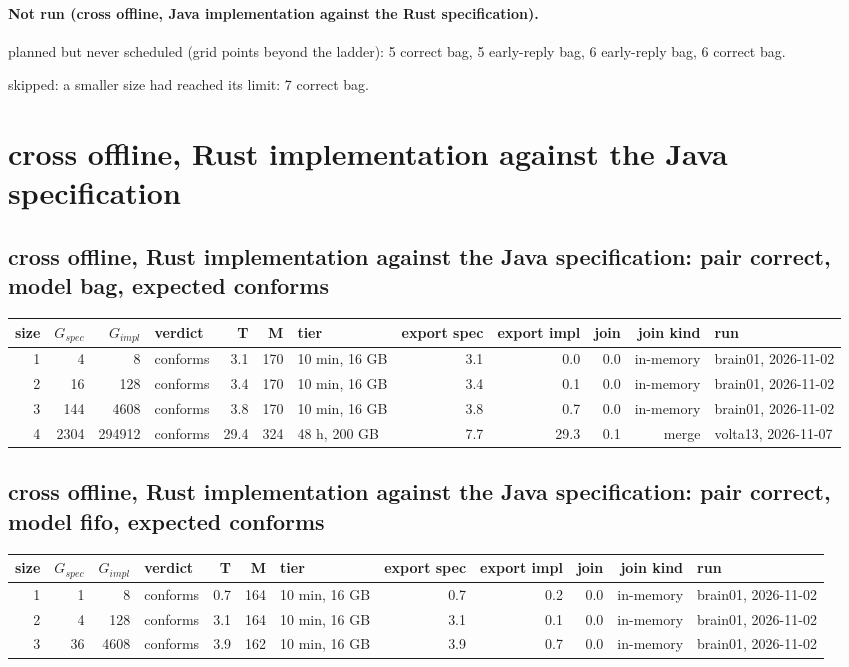 \documentclass[10pt]{article}
\begin{document}
\paragraph{Not run (cross offline, Java implementation against the Rust specification).}
planned but never scheduled (grid points beyond the ladder): 5 correct bag, 5 early-reply bag, 6 early-reply bag, 6 correct bag.\par
skipped: a smaller size had reached its limit: 7 correct bag.\par
\section*{cross offline, Rust implementation against the Java specification}
\subsection*{cross offline, Rust implementation against the Java specification: pair \textsf{correct}, model bag, expected conforms}
\begin{longtable}{@{}rrrlrrlrrrrl@{}}
\toprule
size & $G_{\mathit{spec}}$ & $G_{\mathit{impl}}$ & verdict & T & M & tier & export spec & export impl & join & join kind & run \\
\midrule
\endhead
\color{red} 1 & 4 & 8 & conforms & 3.1 & 170 & 10 min, 16 GB & 3.1 & 0.0 & 0.0 & in-memory & brain01, 2026-11-02 \\
\color{red} 2 & 16 & 128 & conforms & 3.4 & 170 & 10 min, 16 GB & 3.4 & 0.1 & 0.0 & in-memory & brain01, 2026-11-02 \\
\color{red} 3 & 144 & 4608 & conforms & 3.8 & 170 & 10 min, 16 GB & 3.8 & 0.7 & 0.0 & in-memory & brain01, 2026-11-02 \\
\color{red} 4 & 2304 & 294912 & conforms & 29.4 & 324 & 48 h, 200 GB & 7.7 & 29.3 & 0.1 & merge & volta13, 2026-11-07 \\
\bottomrule
\end{longtable}
\subsection*{cross offline, Rust implementation against the Java specification: pair \textsf{correct}, model fifo, expected conforms}
\begin{longtable}{@{}rrrlrrlrrrrl@{}}
\toprule
size & $G_{\mathit{spec}}$ & $G_{\mathit{impl}}$ & verdict & T & M & tier & export spec & export impl & join & join kind & run \\
\midrule
\endhead
\color{red} 1 & 1 & 8 & conforms & 0.7 & 164 & 10 min, 16 GB & 0.7 & 0.2 & 0.0 & in-memory & brain01, 2026-11-02 \\
\color{red} 2 & 4 & 128 & conforms & 3.1 & 164 & 10 min, 16 GB & 3.1 & 0.1 & 0.0 & in-memory & brain01, 2026-11-02 \\
\color{red} 3 & 36 & 4608 & conforms & 3.9 & 162 & 10 min, 16 GB & 3.9 & 0.7 & 0.0 & in-memory & brain01, 2026-11-02 \\
\bottomrule
\end{longtable}
\end{document}
